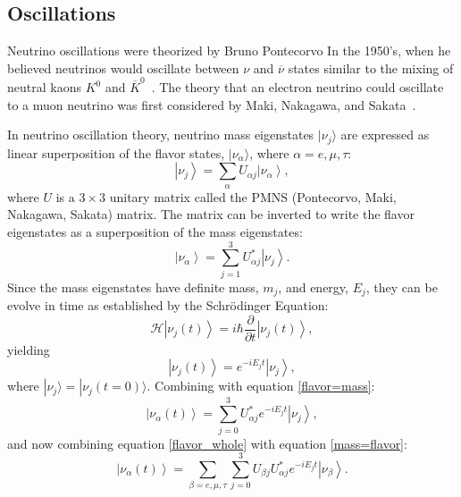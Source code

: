 \documentclass[aps,prd,twocolumn,nofootinbib]{revtex4-1}
\begin{document}
\subsection{Oscillations}
\label{sec:oscillate}
Neutrino oscillations were theorized by Bruno Pontecorvo In the 1950's, when he believed neutrinos would oscillate between $\nu$ and $\overline{\nu}$ states similar to the mixing of neutral kaons $K^0$ and $\overline{K}^0$~\cite{ponte}. The theory that an electron neutrino could oscillate to a muon neutrino was first considered by Maki, Nakagawa, and Sakata~\cite{MNS}.

In neutrino oscillation theory, neutrino mass eigenstates $|\nu_j\rangle$ are expressed as linear superposition of the flavor states, $|\nu_{\alpha}\rangle$, where $\alpha = e,\mu,\tau$:
\begin{equation}
  \left|\nu_j\right\rangle = \sum_{\alpha}U_{\alpha j}\left|\nu_{\alpha}\right\rangle,
  \label{mass=flavor}
\end{equation}
where $U$ is a $3\times3$ unitary matrix called the PMNS (Pontecorvo, Maki, Nakagawa, Sakata) matrix. The matrix can be inverted to write the flavor eigenstates as a superposition of the mass eigenstates:
\begin{equation}
  \left|\nu_{\alpha}\right\rangle = \sum_{j=1}^3U^*_{\alpha j}\left|\nu_{j}\right\rangle.
  \label{flavor=mass}
\end{equation}
Since the mass eigenstates have definite mass, $m_j$, and energy, $E_j$, they can be evolve in time as established by the Schr\"odinger Equation:
\begin{equation}
  \mathcal{H}\left|\nu_j(t)\right\rangle = i\hbar \frac{\partial}{\partial t}\left|\nu_j(t)\right\rangle,
  \label{nu-schro1}
\end{equation}
yielding
\begin{equation}
  \left|\nu_j(t)\right\rangle = e^{-iE_jt}\left|\nu_j\right\rangle,
  \label{nu-schro2}
\end{equation}
where $|\nu_j\rangle = |\nu_j(t=0)\rangle$. Combining with equation \ref{flavor=mass}:
\begin{equation}
  \left|\nu_{\alpha}(t)\right\rangle = \sum_{j=0}^3 U_{\alpha j}^* e^{-iE_jt}\left|\nu_j\right\rangle,
  \label{flavor_whole}
\end{equation}
and now combining equation \ref{flavor_whole} with equation \ref{mass=flavor}:
\begin{equation}
  \left|\nu_{\alpha}(t)\right\rangle = \sum_{\beta=e,\mu,\tau}\sum_{j=0}^3U_{\beta j}U_{\alpha j}^* e^{-iE_jt}\left|\nu_{\beta}\right\rangle.
\end{equation}
\end{document}
